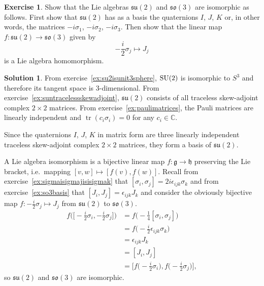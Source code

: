 \documentclass[11pt, a4paper]{report}
\theoremstyle{definition}
\newtheorem{exercise}{Exercise}[part]
\newtheorem{solution}{Solution}[part]
\newenvironment{ex}{\begin{exercise}}{\end{exercise}\pagebreak[1]}
\newenvironment{sol}{\begin{solution}}{\end{solution}\pagebreak[3]}
\newcommand*{\SU}{\ensuremath\text{SU}}
\DeclareMathOperator{\tr}{tr}
\begin{document}
\begin{ex}

Show that the Lie algebras $\mathfrak{su}(2)$ and $\mathfrak{so}(3)$ are isomorphic as follows.
First show that $\mathfrak{su}(2)$ has as a basis the quaternions $I$, $J$, $K$ or, in other words, the matrices $-i \sigma_1$, $-i \sigma_2$, $-i \sigma_3$.
Then show that the linear map $f: \mathfrak{su}(2) \to \mathfrak{so}(3)$ given by
\[
    - \frac{i}{2} \sigma_j \mapsto J_j
\]
is a Lie algebra homomorphism.

\end{ex}

\begin{sol}

From exercise~\ref{ex:su2isunit3sphere}, $\SU(2)$ is isomorphic to $S^3$ and therefore its tangent space is 3-dimensional.
From exercise~\ref{ex:suntracelessskewadjoint}, $\mathfrak{su}(2)$ consists of all traceless skew-adjoint complex $2 \times 2$ matrices.
From exercise~\ref{ex:paulimatrices}, the Pauli matrices are linearly independent and $\tr(c_i \sigma_i) = 0$ for any $c_i \in \mathbb{C}$.

Since the quaternions $I$, $J$, $K$ in matrix form are three linearly independent traceless skew-adjoint complex $2 \times 2$ matrices, they form a basis of $\mathfrak{su}(2)$.

A Lie algebra isomorphism is a bijective linear map $f : \mathfrak{g} \to \mathfrak{h}$ preserving the Lie bracket, i.e.\ mapping $[v, w] \mapsto [f(v), f(w)]$.
Recall from exercise~\ref{ex:sigmaisigmajisisigmak} that $[\sigma_i, \sigma_j] = 2i \epsilon_{ijk} \sigma_k$ and from exercise~\ref{ex:so3basis} that $[J_i, J_j] = \epsilon_{ijk} J_k$
and consider the obviously bijective map $f: - \frac{i}{2} \sigma_j \mapsto J_j$
from $\mathfrak{su}(2)$ to $\mathfrak{so}(3)$.
\begin{align*}
    f \bigl(\bigl[-\tfrac{i}{2} \sigma_i, -\tfrac{i}{2} \sigma_j \bigr] \bigr)
        &= f \bigl( -\tfrac{1}{4} [\sigma_i, \sigma_j] \bigr) \\
        &= f \bigl( -\tfrac{i}{2} \epsilon_{ijk} \sigma_k \bigr) \\
        &= \epsilon_{ijk}J_k \\
        &= [J_i, J_j] \\
        &= \bigl[ f \bigl(-\tfrac{i}{2} \sigma_i \bigr),
                  f \bigl(-\tfrac{i}{2} \sigma_j\bigr) \bigr],
\end{align*}
so $\mathfrak{su}(2)$ and $\mathfrak{so}(3)$ are isomorphic.

\end{sol}
\end{document}
